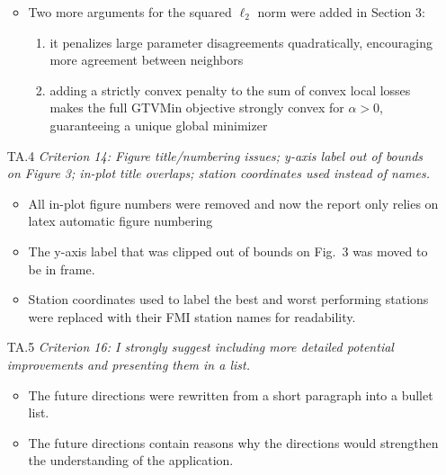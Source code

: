 \documentclass[11pt,onecolumn]{IEEEtran}
\begin{document}
\begin{enumerate}
            \vspace*{2mm}
            \begin{itemize}
                  \item Two more arguments for the squared $\ell_2$ norm were added in Section 3:
                        \begin{enumerate}
                              \item it penalizes large parameter disagreements quadratically, encouraging
                                    more agreement between neighbors
                              \item adding a strictly convex penalty to the sum of convex local losses makes
                                    the full GTVMin objective strongly convex for $\alpha > 0$, guaranteeing a
                                    unique global minimizer
                        \end{enumerate}
            \end{itemize}
            \vspace*{4mm}

      \item[TA.4] {\em Criterion 14: Figure title/numbering issues; y-axis label out of bounds on Figure 3;
            in-plot title overlaps; station coordinates used instead of names.}

            \vspace*{2mm}
            \begin{itemize}
                  \item All in-plot figure numbers were removed and now the report only relies on latex automatic figure numbering
                  \item The y-axis label that was clipped out of bounds on Fig.~3 was moved to be in frame.
                  \item Station coordinates used to label the best and worst performing stations
                        were replaced with their FMI station names for readability.
            \end{itemize}
            \vspace*{4mm}

      \item[TA.5] {\em Criterion 16: I strongly suggest including more detailed potential improvements
            and presenting them in a list.}

            \vspace*{2mm}
            \begin{itemize}
                  \item The future directions were rewritten from a short paragraph into a bullet list.
                  \item The future directions contain reasons why the directions would strengthen the understanding of the application.
            \end{itemize}
            \vspace*{4mm}

\end{enumerate}

\vspace{5mm}
\end{document}
